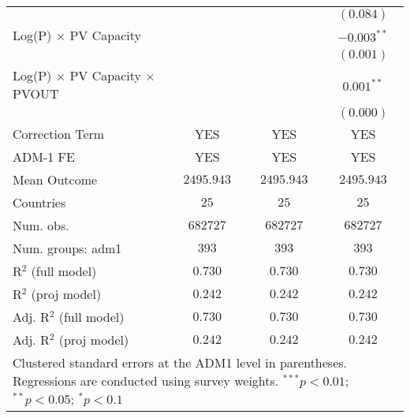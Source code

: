 \begin{table}[htbp]
\begin{center}
\begin{tabular}{l c c c}
                                           &                &                & $(0.084)$     \\
Log(P) $\times$ PV Capacity                &                &                & $-0.003^{**}$ \\
                                           &                &                & $(0.001)$     \\
Log(P) $\times$ PV Capacity $\times$ PVOUT &                &                & $0.001^{**}$  \\
                                           &                &                & $(0.000)$     \\
\hline
Correction Term                            & YES            & YES            & YES           \\
ADM-1 FE                                   & YES            & YES            & YES           \\
Mean Outcome                               & $2495.943$     & $2495.943$     & $2495.943$    \\
Countries                                  & $25$           & $25$           & $25$          \\
Num. obs.                                  & $682727$       & $682727$       & $682727$      \\
Num. groups: adm1                          & $393$          & $393$          & $393$         \\
R$^2$ (full model)                         & $0.730$        & $0.730$        & $0.730$       \\
R$^2$ (proj model)                         & $0.242$        & $0.242$        & $0.242$       \\
Adj. R$^2$ (full model)                    & $0.730$        & $0.730$        & $0.730$       \\
Adj. R$^2$ (proj model)                    & $0.242$        & $0.242$        & $0.242$       \\
\hline
\multicolumn{4}{l}{\scriptsize{Clustered standard errors at the ADM1 level in parentheses. Regressions are conducted using survey weights. $^{***}p<0.01$; $^{**}p<0.05$; $^{*}p<0.1$}}
\end{tabular}
\label{main: tableA8}
\end{center}
\end{table}
